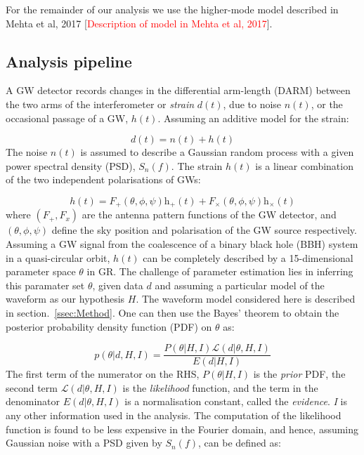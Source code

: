 \documentclass[prd,preprintnumbers,twocolumn,eqsecnum,floatfix,a4paper,nofootinbib,superscriptaddress]{revtex4}
\begin{document}
For the remainder of our analysis we use the higher-mode model described in Mehta et al, 2017 [\textcolor{red}{Description of model in Mehta et al, 2017}].


\subsection{Analysis pipeline}
A GW detector records changes in the differential arm-length (DARM) between the two arms of the interferometer or \emph{strain} $d(t)$, due to noise $n(t)$, or the occasional passage of a GW, $h(t)$. Assuming an additive model for the strain:

\begin{equation}
d(t) = n(t) + h(t)
\label{eq:detector_strain}
\end{equation}
The noise $n(t)$ is assumed to describe a Gaussian random process with a given power spectral density (PSD), $S_n(f)$. The strain $h(t)$ is a linear combination of the two independent polarisations of GWs:

\begin{equation}
h(t) = F_+(\theta, \phi, \psi)\mathrm{h}_+(t) + F_{\times}(\theta, \phi, \psi)\mathrm{h}_{\times}(t)
\end{equation}
where $(F_+, F_x)$ are the antenna pattern functions of the GW detector, and $(\theta, \phi, \psi)$ define the sky position and polarisation of the GW source respectively. Assuming a GW signal from the coalescence of a binary black hole (BBH) system in a quasi-circular orbit, $h(t)$ can be completely described by a 15-dimensional parameter space $\theta$ in GR. The challenge of parameter estimation lies in inferring this paramater set $\theta$, given data $d$ and assuming a particular model of the waveform as our hypothesis $H$. The waveform model considered here is described in section.~\ref{ssec:Method}. One can then use the Bayes' theorem to obtain the posterior probability density function (PDF) on $\theta$ as:

\begin{equation}
p(\theta|d, H, I) = \frac{P(\theta|H, I) \mathcal{L}(d|\theta, H, I)}{E(d|H, I)}
\label{eq:Bayes_theorem}
\end{equation} 
The first term of the numerator on the RHS, $P(\theta|H,I)$ is the \emph{prior} PDF, the second term $\mathcal{L}(d|\theta, H,I)$ is the \emph{likelihood} function, and the term in the denominator $E(d|\theta, H,I)$ is a normalisation constant, called the \emph{evidence}. \emph{I} is any other information used in the analysis. The computation of the likelihood function is found to be less expensive in the Fourier domain, and hence, assuming Gaussian noise with a PSD given by $S_n(f)$, can be defined as:
\end{document}
